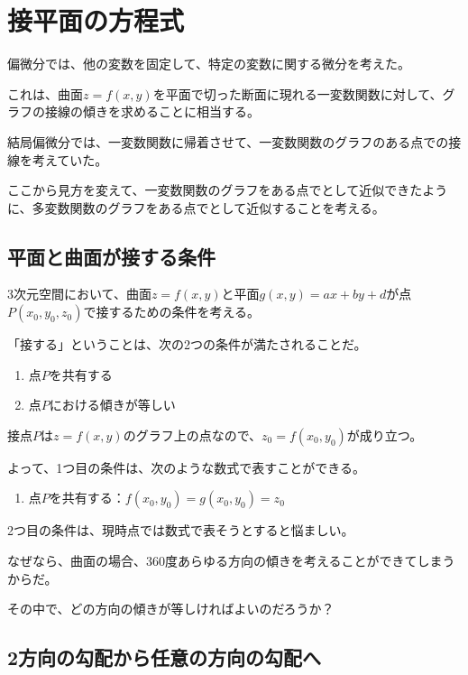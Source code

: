 \documentclass[../../../topic_calculus]{subfiles}
\begin{document}
\sectionline
\section{接平面の方程式}

偏微分では、他の変数を固定して、特定の変数に関する微分を考えた。

これは、曲面$z=f(x,y)$を平面で切った断面に現れる一変数関数に対して、グラフの接線の傾きを求めることに相当する。

\br

結局偏微分では、一変数関数に帰着させて、一変数関数のグラフのある点での接線を考えていた。

\br

ここから見方を変えて、一変数関数のグラフをある点でとして近似できたように、多変数関数のグラフをある点でとして近似することを考える。

\subsection{平面と曲面が接する条件}

3次元空間において、曲面$z=f(x,y)$と平面$g(x,y) = ax+by+d$が点$P(x_0,y_0,z_0)$で接するための条件を考える。

「接する」ということは、次の2つの条件が満たされることだ。

\begin{enumerate}
  \item 点$P$を共有する
  \item 点$P$における傾きが等しい
\end{enumerate}

接点$P$は$z=f(x,y)$のグラフ上の点なので、$z_0 = f(x_0,y_0)$が成り立つ。

よって、1つ目の条件は、次のような数式で表すことができる。
\begin{enumerate}
  \item 点$P$を共有する：$f(x_0,y_0) = g(x_0,y_0) = z_0$
\end{enumerate}

\br

2つ目の条件は、現時点では数式で表そうとすると悩ましい。

なぜなら、曲面の場合、360度あらゆる方向の傾きを考えることができてしまうからだ。

その中で、どの方向の傾きが等しければよいのだろうか？

\subsection{2方向の勾配から任意の方向の勾配へ}
\end{document}
